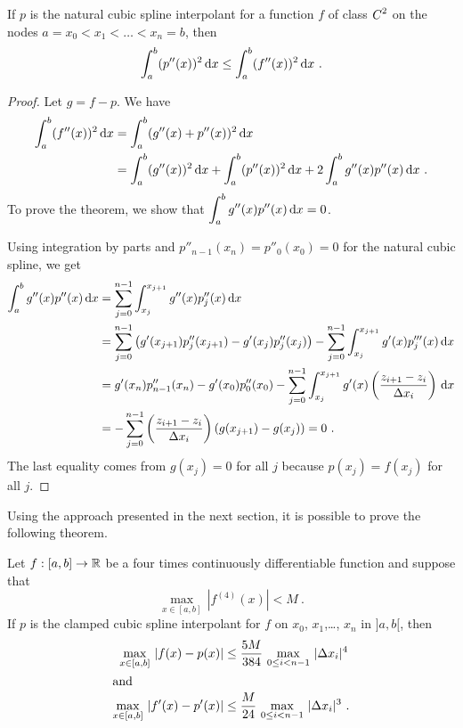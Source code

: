 \begin{theorem}
If $p$ is the natural cubic spline interpolant for a function $f$ of
class $\displaystyle C^2$ on the nodes $a = x_0 < x_1 < \ldots < x_n=b$, then
\[
\int_a^b (p''(x))^2 \,\mathrm{d}x \leq \int_a^b (f''(x))^2 \,\mathrm{d}x \ .
\]
\end{theorem}

\begin{proof}
Let $g = f - p$.  We have
\begin{align*}
\int_a^b (f''(x))^2\,\mathrm{d}x &= \int_a^b (g''(x)+p''(x))^2 \,\mathrm{d}x \\
&= \int_a^b (g''(x))^2\,\mathrm{d}x + \int_a^b (p''(x))^2 \,\mathrm{d}x
+ 2\int_a^b g''(x) p''(x)\,\mathrm{d}x \ .
\end{align*}
To prove the theorem, we show that
$\displaystyle \int_a^b g''(x) p''(x)\,\mathrm{d}x = 0$.

Using integration by parts and $p''_{n-1}(x_n)=p''_0(x_0) = 0$ for
the natural cubic spline, we get
\begin{align*}
\int_a^b g''(x) p''(x)\,\mathrm{d}x &= \sum_{j=0}^{n-1}
\int_{x_j}^{x_{j+1}} g''(x) p''_j(x)\,\mathrm{d}x \\
&= \sum_{j=0}^{n-1} \left(g'(x_{j+1})p''_j(x_{j+1})
- g'(x_j)p''_j(x_j) \right) -
\sum_{j=0}^{n-1} \int_{x_j}^{x_{j+1}} g'(x) p'''_j(x)\,\mathrm{d}x \\
&= g'(x_n)p''_{n-1}(x_n) - g'(x_0)p''_0(x_0) -
\sum_{j=0}^{n-1} \int_{x_j}^{x_{j+1}} g'(x)
\left( \frac{z_{i+1}-z_i}{\Delta{x_i}} \right) \,\mathrm{d}x \\
&= - \sum_{j=0}^{n-1} \left( \frac{z_{i+1}-z_i}{\Delta{x_i}} \right)
\left( g(x_{j+1})-g(x_j) \right) = 0 \ .
\end{align*}
The last equality comes from $g(x_j)=0$ for all $j$ because
$p(x_j)=f(x_j)$ for all $j$.
\end{proof}

Using the approach presented in the next section, it is possible to
prove the following theorem.

\begin{theorem}
Let $f:[a,b]\rightarrow \mathbb{R}$ be a four times continuously
differentiable function and suppose that
\[
\max_{x \in [a,b]}\,|f^{(4)}(x)| < M \ .
\]
If $p$ is the clamped cubic spline interpolant for $f$ on $x_0$,
$x_1$,\ldots, $x_n$ in $]a,b[$, then
\begin{align*}
\max_{x \in [a,b]}\,|f(x)-p(x)| &\leq \frac{5M}{384}\,
\max_{0\leq i<n-1}\,|\Delta{x_i}|^4 \\
\intertext{and}
\max_{x \in [a,b]}\,|f'(x)-p'(x)| &\leq \frac{M}{24}\,
\max_{0\leq i<n-1}\,|\Delta{x_i}|^3 \ .
\end{align*}
\end{theorem}

